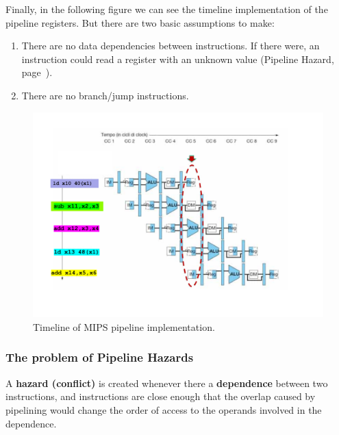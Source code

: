 \documentclass[a4paper]{article}
\newcommand{\definition}[1]{\textcolor{Red3}{\textbf{#1}}\index{#1}}
\begin{document}
    \noindent
    Finally, in the following figure we can see the timeline implementation of the pipeline registers. But there are two basic assumptions to make:
    \begin{enumerate}
        \item There are no data dependencies between instructions. If there were, an instruction could read a register with an unknown value (Pipeline Hazard, page~\pageref{subsubsection: The problem of Pipeline Hazards}).

        \item There are no branch/jump instructions.
    \end{enumerate}
    \begin{figure}[!htp]
        \centering
        \includegraphics[width=\textwidth]{img/pipeline-registers-2.pdf}
        \caption{Timeline of MIPS pipeline implementation.\cite{pipelining-slides}}
    \end{figure}

    \newpage

    \subsubsection{The problem of Pipeline Hazards}\label{subsubsection: The problem of Pipeline Hazards}

    \begin{definitionbox}
        A \definition{hazard (conflict)} is created whenever there a \textbf{dependence} between two instructions, and instructions are close enough that the overlap caused by pipelining would change the order of access to the operands involved in the dependence.
    \end{definitionbox}
\end{document}

